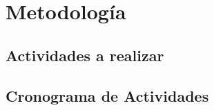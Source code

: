 
\chapter{Metodología} %

\label{ch:metodologia} %
\section{Actividades a realizar}
\section{Cronograma de Actividades}

